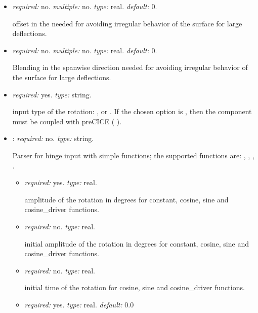 \begin{itemize}
    \item {} \textit{required:} no. \textit{multiple:} no. \textit{type:} real. \textit{default:} 0.
    
    offset in the  needed for avoiding irregular behavior of the surface for large deflections.

    \item {} \textit{required:} no. \textit{multiple:} no. \textit{type:} real. \textit{default:} 0.
    
    Blending in the spanwise direction needed for avoiding irregular behavior of the surface for large deflections.
    
    \item {}
    \textit{required:} yes. \textit{type:} string.
    
    input type of the rotation: ,  or . 
    If the chosen option is , then the component must be coupled with preCICE ( ).
    
    \item {}: \textit{required:} no. \textit{type:} string. 
    
    Parser for hinge input with simple functions; the supported functions are: 
    , , , . 
    \begin{itemize}
        \item {} \textit{required:} yes. \textit{type:} real. 
        
        amplitude of the rotation in degrees for constant, cosine, sine and cosine_driver functions. 

        \item {} \textit{required:} no. \textit{type:} real. 
        
        initial amplitude of the rotation in degrees for constant, cosine, sine and cosine_driver functions.

        \item {} \textit{required:} no. \textit{type:} real. 
        
        initial time of the rotation for cosine, sine and cosine_driver functions.

        \item {} \textit{required:} yes. \textit{type:} real. \textit{default:} 0.0 
        

\end{itemize}
\end{itemize}
